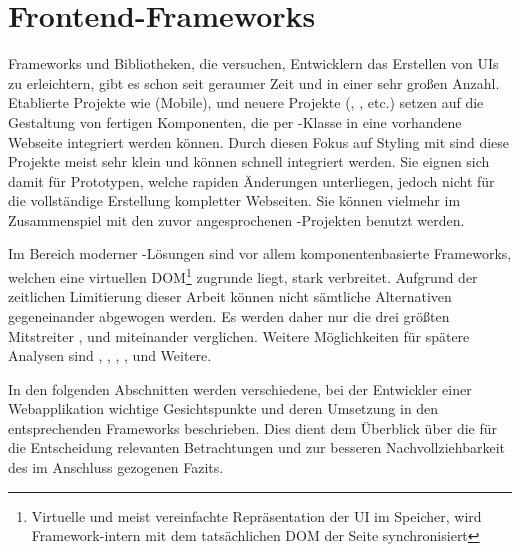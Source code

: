 \section{Frontend-Frameworks}
Frameworks und Bibliotheken, die versuchen, Entwicklern das Erstellen von UIs zu erleichtern, gibt es schon seit geraumer Zeit und in einer sehr großen Anzahl. Etablierte Projekte wie  (Mobile),  und neuere Projekte (, ,  etc.) setzen auf die Gestaltung von fertigen Komponenten, die per -Klasse in eine vorhandene Webseite integriert werden können. Durch diesen Fokus auf Styling mit  sind diese Projekte meist sehr klein und können schnell integriert werden. Sie eignen sich damit für Prototypen, welche rapiden Änderungen unterliegen, jedoch nicht für die vollständige Erstellung kompletter Webseiten. Sie können vielmehr im Zusammenspiel mit den zuvor angesprochenen -Projekten benutzt werden.

Im Bereich moderner -Lösungen sind vor allem komponentenbasierte Frameworks, welchen eine virtuellen DOM\footnote{Virtuelle und meist vereinfachte Repräsentation der UI im Speicher, wird Framework-intern mit dem tatsächlichen DOM der Seite synchronisiert} zugrunde liegt, stark verbreitet. Aufgrund der zeitlichen Limitierung dieser Arbeit können nicht sämtliche Alternativen gegeneinander abgewogen werden. Es werden daher nur die drei größten Mitstreiter ,  und  \parencite[vgl.][]{greif_benitte_rambeau_2018} miteinander verglichen. Weitere Möglichkeiten für spätere Analysen sind , , , , und Weitere.

In den folgenden Abschnitten werden verschiedene, bei der Entwickler einer Webapplikation wichtige Gesichtspunkte und deren Umsetzung in den entsprechenden Frameworks beschrieben. Dies dient dem Überblick über die für die Entscheidung relevanten Betrachtungen und zur besseren Nachvollziehbarkeit des im Anschluss gezogenen Fazits.

